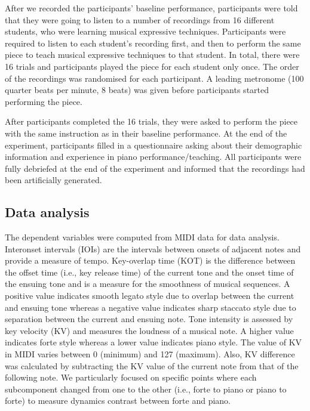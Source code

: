 \documentclass[
  man,floatsintext]{apa6}
\begin{document}
After we recorded the participants' baseline performance, participants were told that they were going to listen to a number of recordings from 16 different students, who were learning musical expressive techniques. Participants were required to listen to each student's recording first, and then to perform the same piece to teach musical expressive techniques to that student. In total, there were 16 trials and participants played the piece for each student only once. The order of the recordings was randomised for each participant. A leading metronome (100 quarter beats per minute, 8 beats) was given before participants started performing the piece.

After participants completed the 16 trials, they were asked to perform the piece with the same instruction as in their baseline performance. At the end of the experiment, participants filled in a questionnaire asking about their demographic information and experience in piano performance/teaching. All participants were fully debriefed at the end of the experiment and informed that the recordings had been artificially generated.

\hypertarget{data-analysis}{%
\subsection{Data analysis}\label{data-analysis}}

The dependent variables were computed from MIDI data for data analysis. Interonset intervals (IOIs) are the intervals between onsets of adjacent notes and provide a measure of tempo. Key-overlap time (KOT) is the difference between the offset time (i.e., key release time) of the current tone and the onset time of the ensuing tone and is a measure for the smoothness of musical sequences. A positive value indicates smooth legato style due to overlap between the current and ensuing tone whereas a negative value indicates sharp staccato style due to separation between the current and ensuing note. Tone intensity is assessed by key velocity (KV) and measures the loudness of a musical note. A higher value indicates forte style whereas a lower value indicates piano style. The value of KV in MIDI varies between 0 (minimum) and 127 (maximum). Also, KV difference was calculated by subtracting the KV value of the current note from that of the following note. We particularly focused on specific points where each subcomponent changed from one to the other (i.e., forte to piano or piano to forte) to measure dynamics contrast between forte and piano.
\end{document}
